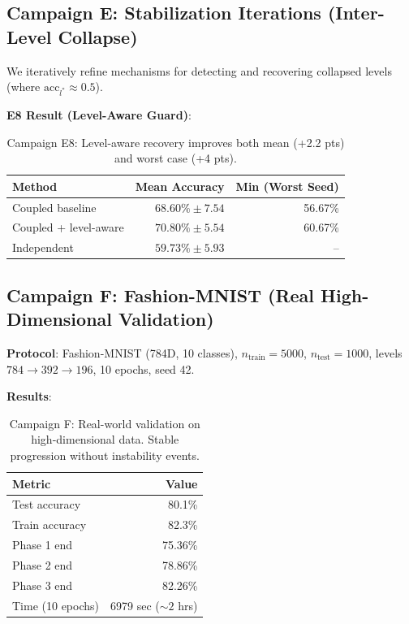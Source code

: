 \documentclass[11pt,a4paper]{article}
\begin{document}
\subsection{Campaign E: Stabilization Iterations (Inter-Level Collapse)}

We iteratively refine mechanisms for detecting and recovering collapsed levels (where $\text{acc}_{l^*} \approx 0.5$).

\textbf{E8 Result (Level-Aware Guard)}:
\begin{table}[h]
\centering
\begin{tabular}{lrr}
\toprule
\textbf{Method} & \textbf{Mean Accuracy} & \textbf{Min (Worst Seed)} \\
\midrule
Coupled baseline & $68.60\% \pm 7.54$ & 56.67\% \\
Coupled + level-aware & $70.80\% \pm 5.54$ & 60.67\% \\
Independent & $59.73\% \pm 5.93$ & -- \\
\bottomrule
\end{tabular}
\caption{Campaign E8: Level-aware recovery improves both mean (+2.2 pts) and worst case (+4 pts).}
\end{table}

\subsection{Campaign F: Fashion-MNIST (Real High-Dimensional Validation)}

\textbf{Protocol}: Fashion-MNIST (784D, 10 classes), $n_{\text{train}}=5000$, $n_{\text{test}}=1000$, levels $784 \to 392 \to 196$, 10 epochs, seed 42.

\textbf{Results}:
\begin{table}[h]
\centering
\begin{tabular}{lr}
\toprule
\textbf{Metric} & \textbf{Value} \\
\midrule
Test accuracy & 80.1\% \\
Train accuracy & 82.3\% \\
Phase 1 end & 75.36\% \\
Phase 2 end & 78.86\% \\
Phase 3 end & 82.26\% \\
Time (10 epochs) & 6979 sec ($\sim 2$ hrs) \\
\bottomrule
\end{tabular}
\caption{Campaign F: Real-world validation on high-dimensional data. Stable progression without instability events.}
\end{table}
\end{document}
